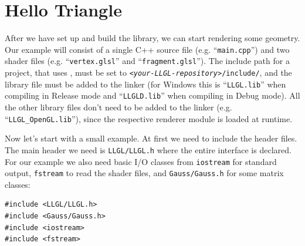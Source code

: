 \documentclass{article}
\begin{document}







\newpage

\section*{Hello Triangle}

After we have set up and build the library, we can start rendering some geometry.
Our example will consist of a single C++ source file (e.g. ``\texttt{main.cpp}'') and two shader files
(e.g. ``\texttt{vertex.glsl}'' and ``\texttt{fragment.glsl}'').
The include path for a project, that uses \LLGL, must be set to \texttt{\textit{<your-LLGL-repository>}/include/},
and the \LLGL library file must be added to the linker (for Windows this is ``\texttt{LLGL.lib}''
when compiling in Release mode and ``\texttt{LLGLD.lib}'' when compiling in Debug mode).
All the other library files don't need to be added to the linker (e.g. ``\texttt{LLGL\_OpenGL.lib}''),
since the respective renderer module is loaded at runtime.

Now let's start with a small example. At first we need to include the header files.
The main header we need is \texttt{LLGL/LLGL.h} where the entire \LLGL interface is declared.
For our example we also need basic I/O classes from \texttt{iostream} for standard output, \texttt{fstream}
to read the shader files, and \texttt{Gauss/Gauss.h} for some matrix classes:
\begin{lstlisting}
#include <LLGL/LLGL.h>
#include <Gauss/Gauss.h>
#include <iostream>
#include <fstream>
\end{lstlisting}
\end{document}
